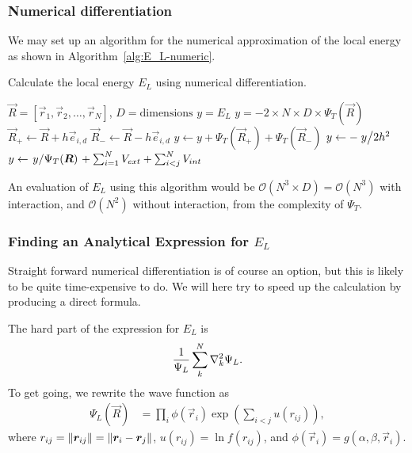 \documentclass[a4paper, 11pt]{article}
\begin{document}
\begin{multicols}{2}
\subsubsection{Numerical differentiation}
We may set up an algorithm for the numerical approximation of the local energy
as shown in Algorithm~\ref{alg:E_L-numeric}.
\begin{algorithm}[H]
    \caption{Calculate the local energy $E_L$ using numerical differentiation.}
    \label{alg:E_L-numeric}
    \begin{algorithmic}[1]
        \REQUIRE $\vec R = [\vec r_1,\vec r_2,\dots,\vec r_N]$, $D=\text{dimensions}$
        \ENSURE $y = E_L$
        \STATE $y = -2\times N\times D\times  \Psi_T(\vec R)$
                \STATE $\vec R_+\leftarrow \vec R + h \vec e_{i, d}$
                \STATE $\vec R_-\leftarrow \vec R - h \vec e_{i, d}$
                \STATE $y\leftarrow y + \Psi_T(\vec R_+) + \Psi_T(\vec R_-)$
            \ENDFOR
        \ENDFOR
        \STATE $y\leftarrow -\flatfrac{y}{2h^2}$
        \STATE $y\leftarrow \flatfrac{y}{\Psi_T(\vec R)}+\sum_{i=1}^N V_{ext} + \sum_{i<j}^N V_{int} $
    \end{algorithmic}
\end{algorithm}
An evaluation of $E_L$ using this algorithm would be $\mathcal{O}(N^3\times
D)=\mathcal{O}(N^3)$ with interaction, and $\mathcal{O}(N^2)$ without interaction, from
the complexity of $\Psi_T$.



\subsubsection{Finding an Analytical Expression for $E_L$}
Straight forward numerical differentiation is of course an
option, but this is likely to be quite time-expensive to do. We will here try to
speed up the calculation by producing a direct formula.

The hard part of the expression for $E_L$ is
\begin{align}
    \frac{1}{\Psi_L}\sum_{k}^N\laplacian_k{\Psi_L}.
\end{align}
To get going, we rewrite the wave function as
\begin{align}
    \Psi_L(\vec R) &= \prod_i \phi(\vec r_i)\exp(\sum_{i<j}u(r_{ij})),
\end{align}
where $r_{ij} = \norm{\bm r_{ij}} = \norm{\bm r_i - \bm r_j}$, $u(r_{ij}) =
\ln f(r_{ij})$, and $\phi(\vec r_i)=g(\alpha,\beta,\vec r_i)$.


\end{multicols}
\end{document}
